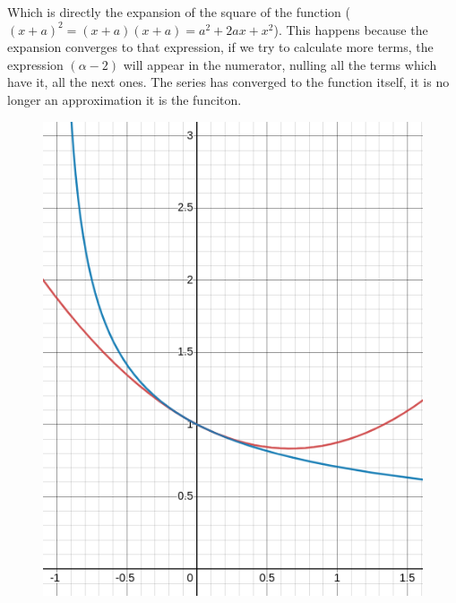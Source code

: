\documentclass{report}
\begin{document}
  \noindent Which is directly the expansion of the square of the function ($(x+a)^2=(x+a)(x+a)=a^2+2ax+x^2$). This happens because the expansion converges to that expression, if we try to calculate more terms, the expression $(\alpha-2)$ will appear in the numerator, nulling all the terms which have it, all the next ones. The series has converged to the function itself, it is no longer an approximation it is the funciton.
  \begin{figure}
    \centering
    \includegraphics[width=\textwidth]{fotos/Screenshot from 2024-02-20 11-20-39.png}
  \end{figure}
\end{document}
